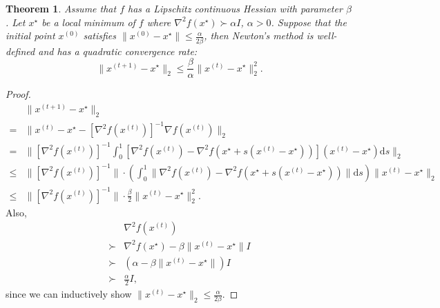 \documentclass[openany]{book}
\newtheorem{theorem}{Theorem}[chapter]
\theoremstyle{definition}
\theoremstyle{remark}
\begin{document}
\begin{theorem}
    Assume that $f$ has a Lipschitz continuous Hessian with parameter $\beta$. Let $x^{\star}$ be a local minimum of $f$ where $\nabla^2f(x^{\star})\succ\alpha I$, $\alpha>0$. Suppose that the initial point $x^{(0)}$ satisfies $\|x^{(0)}-x^{\star}\|\le \frac{\alpha}{2\beta}$, then Newton's method is well-defined and has a quadratic convergence rate:
    \begin{equation}
        \|x^{(t+1)}-x^{\star}\|_2\le \frac{\beta}{\alpha}\|x^{(t)}-x^{\star}\|_2^2.
    \end{equation}
\end{theorem}
\begin{proof}
    \begin{equation*}
        \begin{array}{cl}
             & \|x^{(t+1)}-x^{\star}\|_2 \\
            = & \|x^{(t)}-x^{\star}-[\nabla^2f(x^{(t)})]^{-1}\nabla f(x^{(t)})\|_2 \\
            = & \|[\nabla^2f(x^{(t)})]^{-1}\int_0^1[\nabla^2f(x^{(t)})-\nabla^2f(x^{\star}+s(x^{(t)}-x^{\star}))](x^{(t)}-x^{\star})\mathrm{d}s\|_2 \\
            \le & \|[\nabla^2f(x^{(t)})]^{-1}\|\cdot(\int_0^1\|\nabla^2f(x^{(t)})-\nabla^2f(x^{\star}+s(x^{(t)}-x^{\star}))\|\mathrm{d}s)\|x^{(t)}-x^{\star}\|_2 \\
            \le & \|[\nabla^2f(x^{(t)})]^{-1}\|\cdot \frac{\beta}{2}\|x^{(t)}-x^{\star}\|_2^2.
        \end{array}
    \end{equation*}
    Also,
    \begin{equation*}
        \begin{array}{cl}
             & \nabla^2f(x^{(t)}) \\
            \succ & \nabla^2f(x^{\star})-\beta\|x^{(t)}-x^{\star}\|I \\
            \succ & (\alpha-\beta\|x^{(t)}-x^{\star}\|)I \\
            \succ & \frac{\alpha}{2}I,
        \end{array}
    \end{equation*}
    since we can inductively show $\|x^{(t)}-x^{\star}\|_2\le \frac{\alpha}{2\beta}$.
\end{proof}
\end{document}
